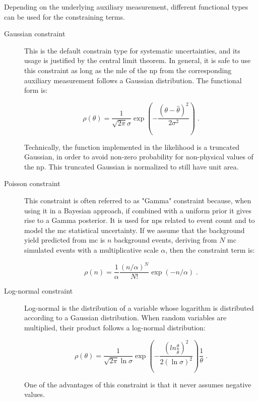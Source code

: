 Depending on the underlying auxiliary measurement, different functional types can be used for the constraining terms.

\begin{description}
\item[Gaussian constraint] This is the default constrain type for systematic uncertainties, and its usage is justified by the central limit theorem. In general, it is safe to use this constraint as long as the \gls{mle} of the \gls{np} from the corresponding auxiliary measurement follows a Gaussian distribution. The functional form is:

\begin{equation}
\label{eq:stat:gauss}
\rho( \theta) = \frac{1}{\sqrt{2\pi}\sigma}\exp\left( -\frac{(\theta - \hat{\theta})^2}{2\sigma^2} \right) \; .
\end{equation}

\noindent Technically, the function implemented in the likelihood is a truncated Gaussian, in order to avoid non-zero probability for non-physical values of the \gls{np}. This truncated Gaussian is normalized to still have unit area.

\item[Poisson constraint] This constraint is often referred to as "Gamma" constraint because, when using it in a Bayesian approach, if combined with a uniform prior it gives rise to a Gamma posterior. It is used for \glspl{np} related to event count and to model the \gls{mc} statistical uncertainty. If we assume that the background yield predicted from \gls{mc} is $n$ background events, deriving from $N$ \gls{mc} simulated events with a multiplicative scale $\alpha$, then the constraint term is:

\begin{equation}
\label{eq:stat:poisson}
\rho(n) = \frac{1}{\alpha} \frac{(n/\alpha)^N}{N!} \exp\left( -n/\alpha \right) \; .
\end{equation}

\item[Log-normal constraint] Log-normal is the distribution of a variable whose logarithm is distributed according to a Gaussian distribution. When random variables are multiplied, their product follows a log-normal distribution:

\begin{equation}
\label{eq:stat:lognorm}
\rho( \theta) = \frac{1}{\sqrt{2\pi}\ln{\sigma}}\exp\left( -\frac{(ln{\frac{\theta}{\hat{\theta}}})^2}{2(\ln{\sigma})^2} \right)\frac{1}{\theta} \; .
\end{equation}

\noindent One of the advantages of this constraint is that it never assumes negative values.

\end{description}



